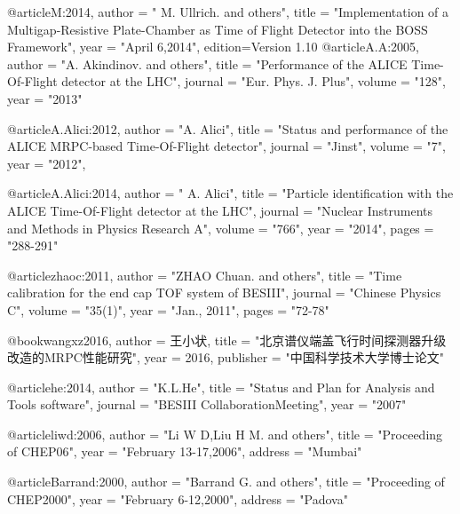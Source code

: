 @article{M:2014,
      author         = " M. Ullrich. and others",
      title          = "{Implementation of a Multigap-Resistive Plate-Chamber as Time of Flight Detector into the BOSS Framework}",
      year           = "April 6,2014",
      edition={Version 1.10}
}
@article{A.A:2005,
      author         = "A. Akindinov. and others",
      title          = "{Performance of the ALICE Time-Of-Flight detector at the LHC}",
      journal        = "Eur. Phys. J. Plus",
      volume         = "128",
      year           = "2013"
}

@article{A.Alici:2012,
      author         = "A. Alici",
      title          = "{Status and performance of the ALICE MRPC-based Time-Of-Flight detector}",
      journal        = "Jinst",
      volume         = "7",
      year           = "2012",
}

@article{A.Alici:2014,
      author         = " A. Alici",
      title          = "{Particle identification with the ALICE Time-Of-Flight detector at the LHC}",
      journal        = "Nuclear Instruments and Methods in Physics Research A",
      volume         = "766",
      year           = "2014",
      pages          = "288-291"
}

@article{zhaoc:2011,
      author         = "ZHAO Chuan. and others",
      title          = "{Time calibration for the end cap TOF system of BESIII}",
      journal        = "Chinese Physics C",
      volume         = "35(1)",
      year           = "Jan., 2011",
      pages          = "72-78"
}

@book{wangxz2016,
      author = {{王小状}},
      title = "{北京谱仪端盖飞行时间探测器升级改造的MRPC性能研究}",
      year = {2016},
      publisher = "中国科学技术大学博士论文"
}

@article{he:2014,
      author         = "K.L.He",
      title          = "{Status and Plan for Analysis and Tools software}",
      journal        = "BESIII CollaborationMeeting",
      year           = "2007"
}


@article{liwd:2006,
      author         = "Li W D,Liu H M. and others",
      title          = "{Proceeding of CHEP06}",
      year           = "February 13-17,2006",
      address        = "{Mumbai}"
}
 
@article{Barrand:2000,
      author         = "Barrand G. and others",
      title          = "{Proceeding of CHEP2000}",
      year           = "February 6-12,2000",
      address        = "{Padova}"
}

